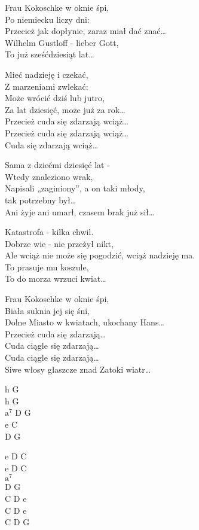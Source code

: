 \begin{text}
    Frau Kokoschke w oknie śpi,\\
    Po niemiecku liczy dni:\\
    Przecież jak dopłynie, zaraz miał dać znać…\\
    Wilhelm Gustloff - lieber Gott,\\
    To już sześćdziesiąt lat…

    \vin Mieć nadzieję i czekać,\\
    \vin Z marzeniami zwlekać:\\
    \vin Może wrócić dziś lub jutro,\\
    \vin Za lat dziesięć, może już za rok…\\
    \vin Przecież cuda się zdarzają wciąż…\\
    \vin Przecież cuda się zdarzają wciąż…\\
    \vin Cuda się zdarzają wciąż…

    Sama z dziećmi dziesięć lat -\\
    Wtedy znaleziono wrak,\\
    Napisali „zaginiony”, a on taki młody,\\
    tak potrzebny był…\\
    Ani żyje ani umarł, czasem brak już sił…

    Katastrofa - kilka chwil.\\
    Dobrze wie - nie przeżył nikt,\\
    Ale wciąż nie może się pogodzić, wciąż nadzieję ma.\\
    To prasuje mu koszule,\\
    To do morza wrzuci kwiat…

    Frau Kokoschke w oknie śpi,\\
    Biała suknia jej się śni,\\
    Dolne Miasto w kwiatach, ukochany Hans…\\
    Przecież cuda się zdarzają…\\
    Cuda ciągle się zdarzają…\\
    Cuda ciągle się zdarzają…\\
    Siwe włosy głaszcze znad Zatoki wiatr…
\end{text}
\begin{chord}
    h G\\
    h G\\
    $\mathrm{a^7}$ D G\\
    e C\\
    D G

    e D C\\
    e D C\\
    $\mathrm{a^7}$\\
    D G\\
    C D e\\
    C D e\\
    C D G
\end{chord}

